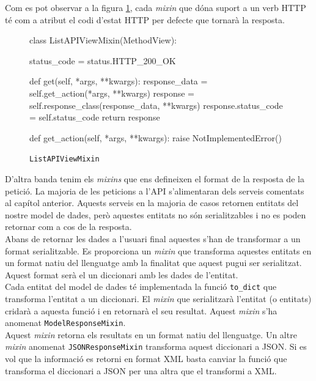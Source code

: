 Com es pot observar a la figura \ref{fig:mixin}, cada \emph{mixin} que dóna suport a un verb \ac{HTTP} té com a atribut el codi d'estat \ac{HTTP} per defecte que tornarà la resposta. \\

\begin{figure}[h!]
	\begin{python}
class ListAPIViewMixin(MethodView):

	status_code = status.HTTP_200_OK
	
	def get(self, *args, **kwargs):
		response_data = self.get_action(*args, **kwargs)
		response = self.response_class(response_data, **kwargs)
		response.status_code = self.status_code
		return response
		
	def get_action(self, *args, **kwargs):
		raise NotImplementedError()
	\end{python}
	\caption{\texttt{ListAPIViewMixin}}
	\label{fig:mixin}
\end{figure}

D'altra banda tenim els \emph{mixins} que ens defineixen el format de la resposta de la petició. La majoria de les peticions a l'\ac{API} s'alimentaran dels serveis comentats al capítol anterior. Aquests serveis en la majoria de casos retornen entitats del nostre model de dades, però aquestes entitats no són serialitzables i no es poden retornar com a cos de la resposta. \\

Abans de retornar les dades a l'usuari final aquestes s'han de transformar a un format serialitzable. Es proporciona un \emph{mixin} que transforma aquestes entitats en un format natiu del llenguatge amb la finalitat que aquest pugui ser serialitzat. Aquest format serà el un diccionari amb les dades de l'entitat.\\

Cada entitat del model de dades té implementada la funció \texttt{to\_dict} que transforma l'entitat a un diccionari. El \emph{mixin} que serialitzarà l'entitat (o entitats) cridarà a aquesta funció i en retornarà el seu resultat. Aquest \emph{mixin} s'ha anomenat \texttt{ModelResponseMixin}.\\

Aquest \emph{mixin} retorna els resultats en un format natiu del llenguatge. Un altre \emph{mixin} anomenat \texttt{JSONResponseMixin} transforma aquest diccionari a \ac{JSON}. Si es vol que la informació es retorni en format \ac{XML} basta canviar la funció que transforma el diccionari a \ac{JSON} per una altra que el transformi a \ac{XML}.\\

